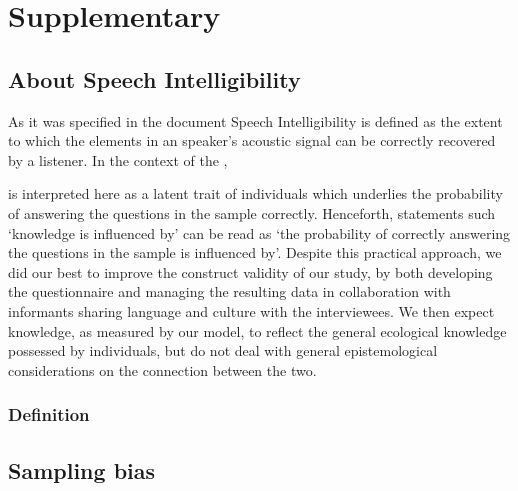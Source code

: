 \section{Supplementary}

\subsection{About Speech Intelligibility}
As it was specified in the document Speech Intelligibility is defined as the extent to which the elements in an speaker's acoustic signal can be correctly recovered by a listener. In the context of the , 

is interpreted here as a latent trait of individuals which underlies the probability of answering the questions in the sample correctly. Henceforth, statements such ‘knowledge is influenced by’ can be read as ‘the probability of correctly answering the questions in the sample is influenced by’. Despite this practical approach, we did our best to improve the construct validity of our study, by both developing the questionnaire and managing the resulting data in collaboration with informants sharing language and culture with the interviewees. We then expect knowledge, as measured by our model, to reflect the general ecological knowledge possessed by individuals, but do not deal with general epistemological considerations on the connection between the two.


\subsubsection{Definition}



\subsection{Sampling bias}




